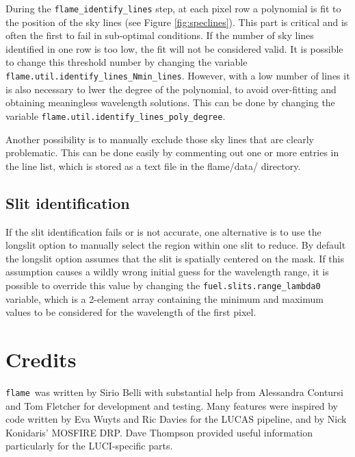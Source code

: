 \documentclass[a4paper, notitlepage]{article}
\newcommand{\flame}{\texttt{flame}}
\begin{document}
During the \texttt{flame\_identify\_lines} step, at each pixel row a polynomial is fit to the position of the sky lines (see Figure \ref{fig:speclines}). This part is critical and is often the first to fail in sub-optimal conditions. If the number of sky lines identified in one row is too low, the fit will not be considered valid. It is possible to change this threshold number by changing the variable \texttt{flame.util.identify\_lines\_Nmin\_lines}. However, with a low number of lines it is also necessary to lwer the degree of the polynomial, to avoid over-fitting and obtaining meaningless wavelength solutions. This can be done by changing the variable \texttt{flame.util.identify\_lines\_poly\_degree}.

Another possibility is to manually exclude those sky lines that are clearly problematic. This can be done easily by commenting out one or more entries in the line list, which is stored as a text file in the flame/data/ directory.


\subsection{Slit identification}

If the slit identification fails or is not accurate, one alternative is to use the longslit option to manually select the region within one slit to reduce. By default the longslit option assumes that the slit is spatially centered on the mask. If this assumption causes a wildly wrong initial guess for the wavelength range, it is possible to override this value by changing the \texttt{fuel.slits.range\_lambda0} variable, which is a 2-element array containing the minimum and maximum values to be considered for the wavelength of the first pixel.





\vspace{10mm}

\section*{Credits}

\flame\ was written by Sirio Belli with substantial help from Alessandra Contursi and Tom Fletcher for development and testing. Many features were inspired by code written by Eva Wuyts and Ric Davies for the LUCAS pipeline, and by Nick Konidaris' MOSFIRE DRP. Dave Thompson provided useful information particularly for the LUCI-specific parts.
\end{document}
